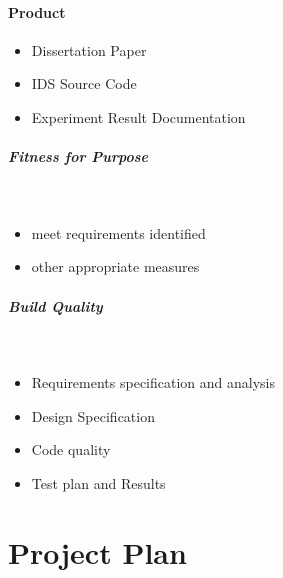 \paragraph{Product}
\begin{itemize}
	\item Dissertation Paper
	\item IDS Source Code
	\item Experiment Result Documentation
\end{itemize}

\subparagraph{Fitness for Purpose}~
\begin{itemize}
	\item meet requirements identified
	\item other appropriate measures
\end{itemize}

\subparagraph{Build Quality}~
\begin{itemize}
	\item Requirements specification and analysis
	\item Design Specification
	\item Code quality
	\item Test plan and Results
\end{itemize}

\clearpage

\section{Project Plan}
\noindent
{}
